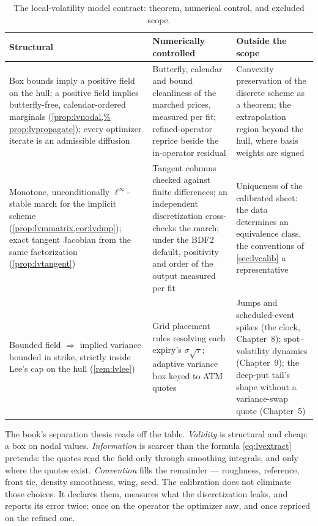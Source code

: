 \begin{table}[htbp]
\centering\small
\begin{tabular}{@{}>{\raggedright\arraybackslash}p{}
>{\raggedright\arraybackslash}p{}
>{\raggedright\arraybackslash}p{}@{}}
\toprule
\textbf{Structural} & \textbf{Numerically controlled} &
\textbf{Outside the scope}\\
\midrule
Box bounds imply a positive field on the hull; a positive field implies
butterfly-free, calendar-ordered marginals (\cref{prop:lvnodal,%
prop:lvpropagate}); every optimizer iterate is an admissible diffusion &
Butterfly, calendar and bound cleanliness of the marched prices, measured
per fit; refined-operator reprice beside the in-operator residual &
Convexity preservation of the discrete scheme as a theorem; the
extrapolation region beyond the hull, where basis weights are signed\\[4pt]
Monotone, unconditionally $\ell^\infty$-stable march for the
implicit scheme (\cref{prop:lvmmatrix,cor:lvdmp}); exact tangent
Jacobian from the same factorization (\cref{prop:lvtangent}) &
Tangent columns checked against finite differences; an independent
discretization cross-checks the march; under the BDF2 default,
positivity and order of the output measured per fit &
Uniqueness of the calibrated sheet: the data determines an equivalence
class, the conventions of \cref{sec:lvcalib} a representative\\[4pt]
Bounded field $\Rightarrow$ implied variance bounded in strike, strictly
inside Lee's cap on the hull (\cref{rem:lvlee}) & Grid placement rules
resolving each expiry's $\sigma\sqrt\tau$; adaptive variance box keyed to
ATM quotes & Jumps and scheduled-event spikes (the clock, Chapter~8);
spot--volatility dynamics (Chapter~9); the deep-put tail's shape without a
variance-swap quote (Chapter~5)\\
\bottomrule
\end{tabular}
\caption{The local-volatility model contract: theorem, numerical control,
and excluded scope.}
\label{tab:lvcontract}
\end{table}

The book's separation thesis reads off the table.  \emph{Validity} is
structural and cheap: a box on nodal values.  \emph{Information} is
scarcer than the formula \eqref{eq:lvextract} pretends: the quotes
read the field only through smoothing integrals, and only where the
quotes exist.  \emph{Convention} fills the remainder --- roughness,
reference, front tie, density smoothness, wing, seed.  The calibration does not eliminate
those choices.  It declares them, measures what the discretization
leaks, and reports its error twice: once on the operator the optimizer
saw, and once repriced on the refined one.
